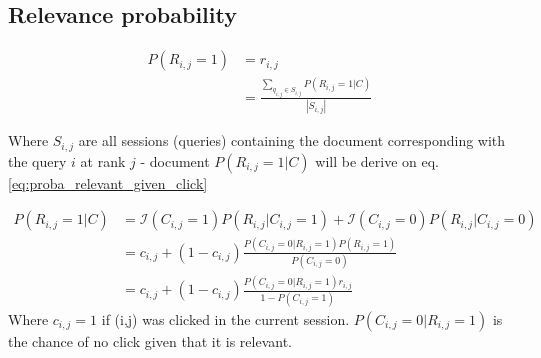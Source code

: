 \subsection{Relevance probability}
\begin{align*}
P(R_{i,j} = 1)
&= r_{i,j} \\
&= \frac{\sum_{q_{i,j} \in S_{i,j}} P(R_{i,j}=1 | C)}{|S_{i,j}|}
\end{align*}

Where $S_{i,j}$ are all sessions (queries) containing the document corresponding with the query $i$ at rank $j$ - document
$P(R_{i,j}=1 | C)$ will be derive on eq.\ref{eq:proba_relevant_given_click}

\begin{align}
P(R_{i,j}=1 | C)
&= \mathcal{I}(C_{i,j} = 1) P(R_{i,j}|C_{i,j}=1) + \mathcal{I}(C_{i,j} = 0) P(R_{i,j}|C_{i,j}=0) \\
&= c_{i,j} + (1-c_{i,j}) \frac {P(C_{i,j}=0|R_{i,j}=1) P(R_{i,j} = 1)} {P(C_{i,j} = 0)} \\
&= c_{i,j} + (1-c_{i,j}) \frac {P(C_{i,j}=0|R_{i,j}=1) r_{i,j}} { 1 - P(C_{i,j} = 1)}
\label{eq:proba_relevant_given_click}
\end{align}
Where $c_{i,j} = 1$ if (i,j) was clicked in the current session.
$P(C_{i,j}=0|R_{i,j}=1)$ is the chance of no click given that it is relevant. 

